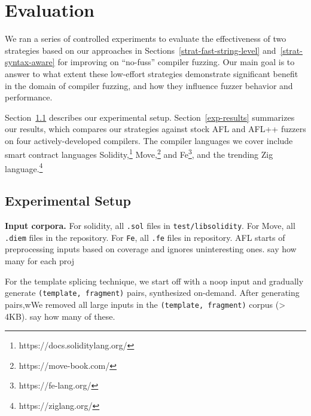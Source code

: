 \section{Evaluation}
\label{eval}

We ran a series of controlled experiments to evaluate the effectiveness of two
strategies based on our approaches in Sections~\ref{strat-fast-string-level}
and~\ref{strat-syntax-aware} for improving on ``no-fuss'' compiler fuzzing. Our
main goal is to answer to what extent these low-effort strategies demonstrate
significant benefit in the domain of compiler fuzzing, and how they influence
fuzzer behavior and performance.

Section~\ref{exp-setup} describes our experimental setup.
Section~\ref{exp-results} summarizes our results, which compares our strategies
against stock AFL and AFL++ fuzzers on four actively-developed compilers. The
compiler languages we cover include
smart contract languages
Solidity,\footnote{https://docs.soliditylang.org/}
Move,\footnote{https://move-book.com/} and Fe\footnote{https://fe-lang.org/},
and the trending Zig
language.\footnote{https://ziglang.org/}

\subsection{Experimental Setup}
\label{exp-setup}



\noindent 
\textbf{Input corpora.} For solidity, all \texttt{.sol} files in
\texttt{test/libsolidity}. For Move, all \texttt{.diem} files in the
repository. For \texttt{Fe}, {\color{red} all \texttt{.fe} files in
repository}. AFL starts of preprocessing inputs based on coverage and ignores uninteresting ones. {\color{red} say how many for each proj}

For the template splicing technique, we start off with a noop input and
gradually generate \texttt{(template, fragment)} pairs, synthesized on-demand.
After generating pairs,wWe removed all large inputs in the \texttt{(template, fragment)} corpus (> 4KB). {\color{red} say how many of these}.



